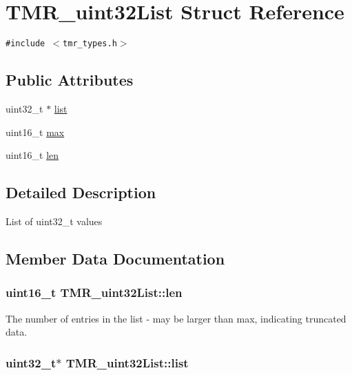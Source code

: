 \hypertarget{struct_t_m_r__uint32_list}{
\section{TMR\_\-uint32List Struct Reference}
\label{struct_t_m_r__uint32_list}
}
{\tt \#include $<$tmr\_\-types.h$>$}

\subsection*{Public Attributes}
\begin{CompactItemize}
\item 
uint32\_\-t $\ast$ \hyperlink{struct_t_m_r__uint32_list_d8fe485bf43f8dca8c1d51298d42c63b}{list}
\item 
uint16\_\-t \hyperlink{struct_t_m_r__uint32_list_5593bbc5fdbe37350b4c880ada7d7045}{max}
\item 
uint16\_\-t \hyperlink{struct_t_m_r__uint32_list_67adcd552d4c7bd4102380f19f2572a5}{len}
\end{CompactItemize}


\subsection{Detailed Description}
List of uint32\_\-t values 

\subsection{Member Data Documentation}
\hypertarget{struct_t_m_r__uint32_list_67adcd552d4c7bd4102380f19f2572a5}{
\subsubsection[{len}]{\setlength{\rightskip}{0pt plus 5cm}uint16\_\-t {\bf TMR\_\-uint32List::len}}}
\label{struct_t_m_r__uint32_list_67adcd552d4c7bd4102380f19f2572a5}


The number of entries in the list - may be larger than max, indicating truncated data. \hypertarget{struct_t_m_r__uint32_list_d8fe485bf43f8dca8c1d51298d42c63b}{
\subsubsection[{list}]{\setlength{\rightskip}{0pt plus 5cm}uint32\_\-t$\ast$ {\bf TMR\_\-uint32List::list}}}
\label{struct_t_m_r__uint32_list_d8fe485bf43f8dca8c1d51298d42c63b}


